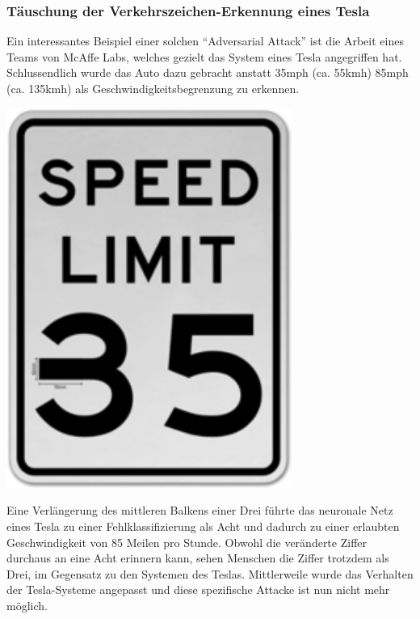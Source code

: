 \documentclass[
  12pt, %
  a4paper, %
  oneside, %
  openany, 
  numbers=noenddot, %
  BCOR=5mm, %
  parskip=half*, %
  thesis, %
]{bfhbook}
\begin{document}

\subsubsection*{Täuschung der Verkehrszeichen-Erkennung eines Tesla}
Ein interessantes Beispiel einer solchen ``Adversarial Attack'' ist die Arbeit eines Teams von McAffe Labs, welches gezielt das System eines Tesla angegriffen hat. Schlussendlich wurde das Auto dazu gebracht anstatt 35mph (ca. 55kmh)  85mph (ca. 135kmh) als Geschwindigkeitsbegrenzung zu erkennen.

\parencite{advTesla} 

\begin{center}
\begin{minipage}[t]{0.45\linewidth}
	\vspace{0pt}
	\centering
	\includegraphics[width=0.7\textwidth]{Bilder/speed-limit-fake-small.png}
\end{minipage}\hfill
\begin{minipage}[t]{0.45\linewidth}
	\vspace{0pt}
	Eine Verlängerung des mittleren Balkens einer Drei führte das neuronale Netz eines Tesla zu einer Fehlklassifizierung als Acht und dadurch zu einer erlaubten Geschwindigkeit von 85 Meilen pro Stunde. Obwohl die veränderte Ziffer durchaus an eine Acht erinnern kann, sehen Menschen die Ziffer trotzdem als Drei, im Gegensatz zu den Systemen des Teslas.
\break\break
Mittlerweile wurde das Verhalten der Tesla-Systeme angepasst und diese spezifische Attacke ist nun nicht mehr möglich.
\end{minipage}
\end{center}
\end{document}
